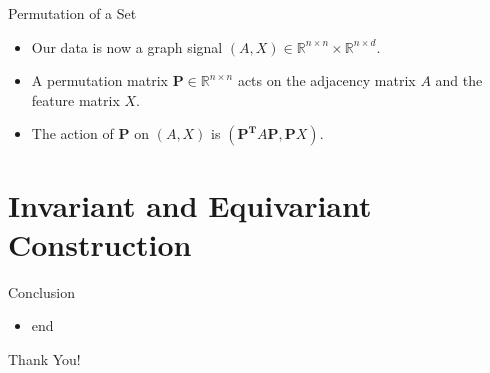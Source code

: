 \documentclass{beamer}
\begin{document}
\begin{frame}{Permutation of a Set}

    \begin{itemize}
        \setlength{\itemsep}{\fill}
        \item Our data is now a graph signal $(A, X) \in \mathbb{R}^{n \times n} \times \mathbb{R}^{n \times d}$. 
        \pause
        \item A permutation matrix $\boldsymbol{P} \in \mathbb{R}^{n \times n}$ acts on the adjacency matrix $A$ and the feature matrix $X$.
        \pause
        \item The action of $\boldsymbol{P}$ on $(A, X)$ is $(\boldsymbol{P^T}A\boldsymbol{P}, \boldsymbol{P}X)$.
    \end{itemize}
    
\end{frame}




\section{Invariant and Equivariant Construction}




\begin{frame}{Conclusion}
    \begin{itemize}
        \item end
    \end{itemize}
\end{frame}



\begin{frame}[plain]
    \centering
    \Huge Thank You!
\end{frame}
\end{document}

